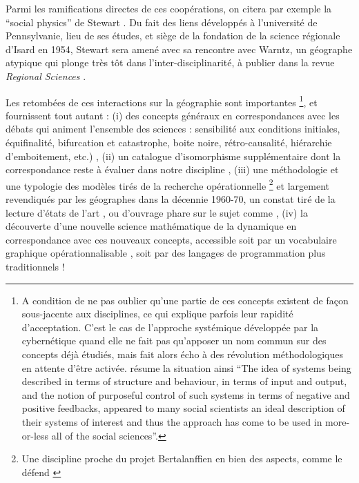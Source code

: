 Parmi les ramifications directes de ces coopérations, on citera par exemple la \enquote{social physics} de Stewart \autocite{Stewart1947}. Du fait des liens développés à l'université de Pennsylvanie, lieu de ses études, et siège de la fondation de la science régionale d'Isard en 1954, Stewart sera amené avec sa rencontre avec Warntz, un géographe atypique qui plonge très tôt dans l'inter-disciplinarité, à publier dans la revue \textit{Regional Sciences} \autocite{Stewart1958}.

Les retombées de ces interactions sur la géographie sont importantes \footnote{ A condition de ne pas oublier qu'une partie de ces concepts existent de façon sous-jacente aux disciplines, ce qui explique parfois leur rapidité d'acceptation. C'est le cas de l'approche systémique développée par la cybernétique quand elle ne fait pas qu'apposer un nom commun sur des concepts déjà étudiés, mais fait alors écho à des révolution méthodologiques en attente d'être activée. \textcite[5]{Batty1976} résume la situation ainsi \foreignquote{english}{The idea of systems being described in terms of structure and behaviour, in terms of input and output, and the notion of purposeful control of such systems in terms of negative and positive feedbacks, appeared to many social scientists an ideal description of their systems of interest and thus the approach has come to be used in more-or-less all of the social sciences}.}, et fournissent tout autant : (i) des concepts généraux en correspondances avec les débats qui animent l'ensemble des sciences : sensibilité aux conditions initiales, équifinalité, bifurcation et catastrophe, boite noire, rétro-causalité, hiérarchie d'emboitement, etc.) , (ii) un catalogue d'isomorphisme supplémentaire dont la correspondance reste à évaluer dans notre discipline \autocite{Wilson1969}, (iii)  une méthodologie et une typologie des modèles tirés de la recherche opérationnelle \autocite{Ackoff1962} \footnote{Une discipline proche du projet Bertalanffien en bien des aspects, comme le défend \autocite[801]{Pouvreau2013}} et largement revendiqués par les géographes dans la décennie 1960-70, un constat tiré de la lecture  d'états de l'art \autocite{Kohn1970}, ou d'ouvrage phare sur le sujet comme \autocite{Berry1964, Haggett1965}, (iv) la découverte d'une nouvelle science mathématique de la dynamique en correspondance avec ces nouveaux concepts, accessible soit par un vocabulaire graphique opérationnalisable \autocite{Forrester1961}, soit par des langages de programmation plus traditionnels !

